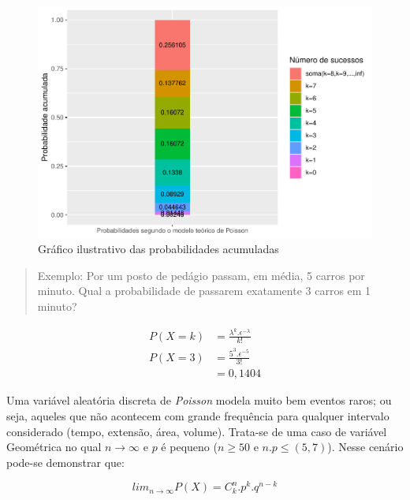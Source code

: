 \documentclass[
]{book}
\begin{document}
\begin{figure}

{\centering \includegraphics[width=1\linewidth]{apostila_files/figure-latex/fig000-1} 

}

\caption{Gráfico ilustrativo das probabilidades acumuladas}\label{fig:fig000}
\end{figure}

\hfill\break

\begin{quote}
Exemplo: Por um posto de pedágio passam, em média, 5 carros por minuto. Qual a probabilidade de passarem exatamente 3 carros em 1 minuto?
\end{quote}

\hfill\break

\begin{align*}
P(X=k) & = \frac{\lambda ^{k}. \epsilon^{-\lambda}} {k!} \\
P(X=3) & = \frac{5^{3}. \epsilon^{-5}} {3!} \\
       & = 0,1404
\end{align*}

Uma variável aleatória discreta de \emph{Poisson} modela muito bem eventos raros; ou seja, aqueles que não acontecem com grande frequência para qualquer intervalo considerado (tempo, extensão, área, volume). Trata-se de uma caso de variável Geométrica no qual \(n \to \infty\) e \(p\) é pequeno (\(n \ge 50\) e \(n . p \le (5,7)\)). Nesse cenário pode-se demonstrar que:

\hfill\break

\[
lim_{n \to \infty} P(X) = {C}_{k}^{n}. {p}^{k}. {q}^{n-k}
\]
\end{document}
